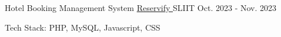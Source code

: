 

\begin{cventries}

  \cventry
    {Hotel Booking Management System} %
    {\href{https://github.com/nmdra/Reservify/}{Reservify  \faGithub}} %
    {SLIIT} %
    {Oct. 2023 - Nov. 2023} %
    {
      \begin{cvitems} %
        \item {Tech Stack: PHP, MySQL, Javascript, CSS}
      \end{cvitems}
    }

\end{cventries}
